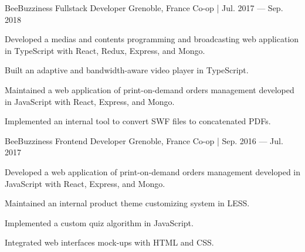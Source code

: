 \begin{cventries}
    \cventry
    {BeeBuzziness} %
    {Fullstack Developer} %
    {Grenoble, France} %
    {Co-op | Jul. 2017 — Sep. 2018} %
    {
    \begin{cvitems} %
        \item {Developed a medias and contents programming and broadcasting web application in TypeScript with React, Redux, Express, and Mongo.}
        \item {Built an adaptive and bandwidth-aware video player in TypeScript.}
        \item {Maintained a web application of print-on-demand orders management developed in JavaScript with React, Express, and Mongo.}
        \item {Implemented an internal tool to convert SWF files to concatenated PDFs.}
    \end{cvitems}
    }

    \cventry
    {BeeBuzziness} %
    {Frontend Developer} %
    {Grenoble, France} %
    {Co-op | Sep. 2016 — Jul. 2017} %
    {
    \begin{cvitems} %
        \item {Developed a web application of print-on-demand orders management developed in JavaScript with React, Express, and Mongo.}
        \item {Maintained an internal product theme customizing system in LESS.}
        \item {Implemented a custom quiz algorithm in JavaScript.}
        \item {Integrated web interfaces mock-ups with HTML and CSS.}
    \end{cvitems}
    }

\end{cventries}
